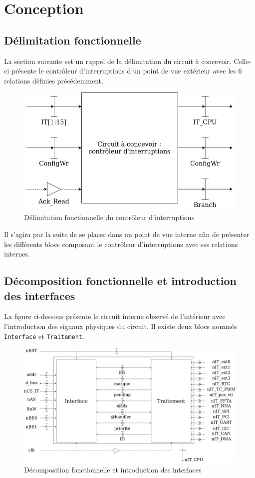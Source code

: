\section{Conception}

\subsection{Délimitation fonctionnelle}

La section suivante est un rappel de la délimitation du circuit à concevoir. Celle-ci présente le contrôleur d'interruptions d'un point de vue extérieur avec les 6 relations définies précédemment.

\begin{figure}[H]
	\centering
	\includegraphics[width=0.6\linewidth]{figure/delimitation_fonctionnelle.png}
	\caption{Délimitation fonctionnelle du contrôleur d'interruptions}
	\label{fig:delimitation_fonctionnelle}
\end{figure}

Il s'agira par la suite de se placer dans un point de vue interne afin de présenter les différents blocs composant le contrôleur d'interruptions avec ses relations internes. 

\subsection{Décomposition fonctionnelle et introduction des interfaces}

La figure ci-dessous présente le circuit interne observé de l'intérieur avec l'introduction des signaux physiques du circuit. Il existe deux blocs nommés \texttt{Interface} et \texttt{Traitement}. 

\begin{figure}[H]
	\centering
	\includegraphics[width=1\linewidth]{figure/decomposition_fonctionnelle.png}
	\caption{Décomposition fonctionnelle et introduction des interfaces}
	\label{fig:decomposition_fonctionnelle}
\end{figure}

